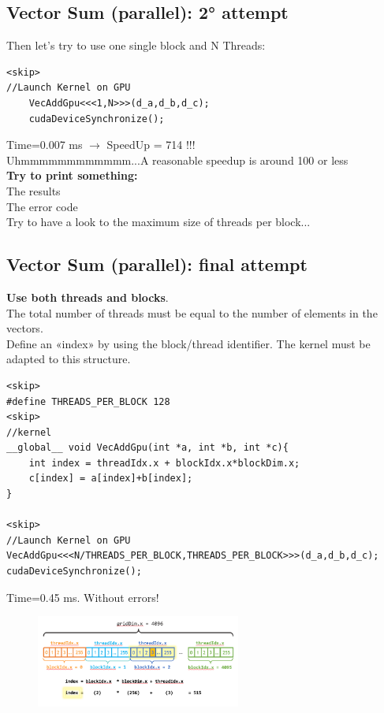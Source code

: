 \subsection{Vector Sum (parallel): 2° attempt}

Then let’s try to use one single block
and N Threads:

\begin{verbatim}
<skip>
//Launch Kernel on GPU
	VecAddGpu<<<1,N>>>(d_a,d_b,d_c);
	cudaDeviceSynchronize();
\end{verbatim}

Time=0.007 ms $\rightarrow$ SpeedUp = 714 !!!\\
Uhmmmmmmmmmmmm...A reasonable speedup is around 100 or less\\
\textbf{Try to print something:}\\
The results\\
The error code\\
Try to have a look to the maximum size of threads per block...

\subsection{Vector Sum (parallel): final attempt}

\textbf{Use both threads and blocks}.\\
The total number of threads must be equal to the number of elements in the vectors.\\ Define an «index» by using the block/thread identifier. The kernel must be adapted to this structure.

\begin{verbatim}
<skip>
#define THREADS_PER_BLOCK 128
<skip>
//kernel
__global__ void VecAddGpu(int *a, int *b, int *c){
	int index = threadIdx.x + blockIdx.x*blockDim.x;
	c[index] = a[index]+b[index];
}

<skip>
//Launch Kernel on GPU
VecAddGpu<<<N/THREADS_PER_BLOCK,THREADS_PER_BLOCK>>>(d_a,d_b,d_c);
cudaDeviceSynchronize();
\end{verbatim}

Time=0.45 ms. Without errors!

\begin{figure}[ht]
	\centering
	\includegraphics[width=0.6\textwidth]{figure_parallel/vector_sum_final.png}
\end{figure}

